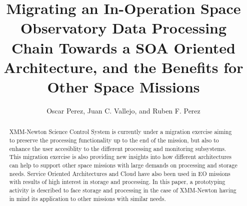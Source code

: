 
\resetcounters




\title{Migrating an In-Operation Space Observatory Data Processing Chain Towards a SOA Oriented Architecture, and the Benefits for Other Space Missions}
\author{Oscar Perez, Juan C. Vallejo, and Ruben F. Perez
}


\begin{abstract}
XMM-Newton Science Control System is currently under a migration exercise  aiming 
to preserve the processing functionality up to the end of the mission, but also
to enhance the user accesiblity to the different processing and monitoring subsystems.
This migration exercise is also providing new insights into
how different architectures can help to support other space missions
with large demands on processing and storage needs.
Service Oriented Architectures and Cloud have also been used in EO missions 
with results of high interest in storage and processing. In this paper, 
a prototyping activity is described to face storage and processing in the case of XMM-Newton having in mind its application to other missions with similar needs.    
\end{abstract}

